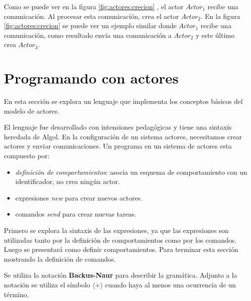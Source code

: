 Como se puede ver en la figura \ref{fig:actores:crecion} , el actor $Actor_1$ recibe una comunicación. Al procesar esta comunicación, crea el actor $Actor_2$. En la figura \ref{fig:actores:crecion}  se puede ver un ejemplo similar donde $Actor_1$ recibe una comunicación, como resultado envía una comunicación a $Actor_2$ y este último crea $Actor_3$.


\section{Programando con actores}\label{actores:sal}

En esta sección se explora un lenguaje que implementa los conceptos básicos del modelo de actores. 

El lenguaje \SAL fue desarrollado con intensiones pedagógicas y tiene una sintaxis heredada de Algol. En la configuración de un sistema actores, necesitamos crear actores y enviar comunicaciones. Un programa en un sistema de actores esta compuesto por:

\begin{itemize}
 \item \textit{definición de comportamientos}: asocia un esquema de comportamiento con un identificador, no crea ningún actor.
 \item expresiones \textit{new} para crear nuevos actores.
 \item comandos \textit{send} para crear nuevas tareas.
\end{itemize}

Primero se explora la sintaxis de las expresiones, ya que las expresiones son utilizadas tanto por la definición de comportamientos como por los comandos. Luego se presentará como definir comportamientos. Para terminar esta sección mostrando la definición de comandos.


Se utiliza la notación \textbf{Backus-Naur}\cite{McCracken:2003:BF:1074100.1074155} para describir la gramática. Adjunto a la notación se utiliza el símbolo $\langle \textbf{+} \rangle$ cuando haya al menos una ocurrencia de un término.

